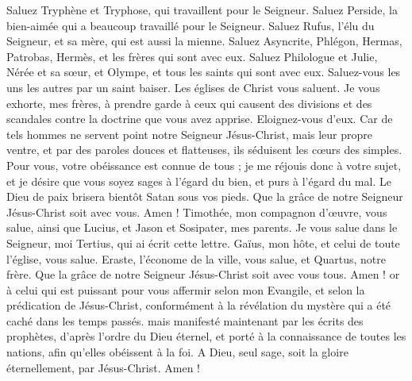 \begin{multicols}{2}
Saluez Tryphène et Tryphose, qui travaillent pour le Seigneur. Saluez Perside, la bien-aimée qui a beaucoup travaillé pour le Seigneur.
Saluez Rufus, l’élu du Seigneur, et sa mère, qui est aussi la mienne.
Saluez Asyncrite, Phlégon, Hermas, Patrobas, Hermès, et les frères qui sont avec eux.
Saluez Philologue et Julie, Nérée et sa sœur, et Olympe, et tous les saints qui sont avec eux.
Saluez-vous les uns les autres par un saint baiser. Les églises de Christ vous saluent.
Je vous exhorte, mes frères, à prendre garde à ceux qui causent des divisions et des scandales contre la doctrine que vous avez apprise. Eloignez-vous d'eux.
Car de tels hommes ne servent point notre Seigneur Jésus-Christ, mais leur propre ventre, et par des paroles douces et flatteuses, ils séduisent les cœurs des simples.
Pour vous, votre obéissance est connue de tous ; je me réjouis donc à votre sujet, et je désire que vous soyez sages à l’égard du bien, et purs à l’égard du mal.
Le Dieu de paix brisera bientôt Satan sous vos pieds. Que la grâce de notre Seigneur Jésus-Christ soit avec vous. Amen !
Timothée, mon compagnon d’œuvre, vous salue, ainsi que Lucius, et Jason et Sosipater, mes parents.
Je vous salue dans le Seigneur, moi Tertius, qui ai écrit cette lettre.
Gaïus, mon hôte, et celui de toute l'église, vous salue. Eraste, l’économe de la ville, vous salue, et Quartus, notre frère.
Que la grâce de notre Seigneur Jésus-Christ soit avec vous tous. Amen !
or à celui qui est puissant pour vous affermir selon mon Evangile, et selon la prédication de Jésus-Christ, conformément à la révélation du mystère qui a été caché dans les temps passés.
mais manifesté maintenant par les écrits des prophètes, d’après l’ordre du Dieu éternel, et porté à la connaissance de toutes les nations, afin qu’elles obéissent à la foi.
A Dieu, seul sage, soit la gloire éternellement, par Jésus-Christ. Amen !
\PPE{}
\end{multicols}
